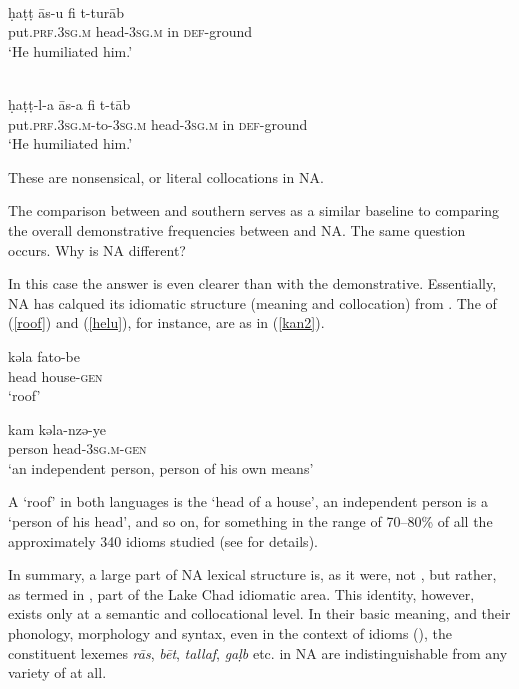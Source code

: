 \documentclass[output=paper]{langsci/langscibook}
\begin{document}
\ea
\ea {} \\
\gll ḥaṭṭ {\R}ās-u fi t-turāb\\
     put.\textsc{prf.3sg.m} head-\textsc{3sg.m} in \textsc{def}{}-ground\\
\glt ‘He humiliated him.’ \label{egy}

\ex {}  \\
\gll ḥaṭṭ-l-a {\R}ās-a fi t-t{\R}āb\\
     put.\textsc{prf.3sg.m}-to-\textsc{3sg.m} head-\textsc{3sg.m} in \textsc{def}{}-ground\\
\glt ‘He humiliated him.’ \label{tun}
\z
\z

These are nonsensical, or literal collocations in NA.

The comparison between  and southern   serves as a similar baseline to comparing the overall demonstrative frequencies between  and NA. The same question occurs. Why is NA different?


In this case the answer is even clearer than with the demonstrative. Essentially, NA has calqued its {idiomatic} structure (meaning and collocation) from . The  of (\ref{roof}) and (\ref{helu}), for instance, are as in (\ref{kan2}).

\ea\label{kan2}
\ea
\gll kəla fato-be\\
     head house-\textsc{gen}\\
\glt ‘roof’\label{fato}

\ex
\gll kam kəla-nzə-ye\\
     person head-\textsc{3sg.m}{}-\textsc{gen}\\
\glt ‘an independent person, person of his own means’\label{kam}
\z
\z

A ‘roof’ in both languages is the ‘head of a house’, an independent person is a ‘person of his head’, and so on, for something in the range of 70–80\% of all the approximately 340 {idioms} studied (see \citealt{Owens1996,Owens2014,Owens2015,Owens2016idioms} for details).

In summary, a large part of NA lexical structure is, as it were, not , but rather, as termed in \citet{Owens1998}, part of the {Lake Chad} {idiomatic} area. This {identity}, however, exists only at a semantic and collocational level. In their basic meaning, and their phonology, morphology and syntax, even in the context of {idioms} (\citealt{OwensDodsworth2017}), the constituent lexemes \textit{rās}, \textit{bēt}, \textit{tallaf}, \textit{gaḷb} etc. in NA are indistinguishable from any variety of  at all.
\end{document}
